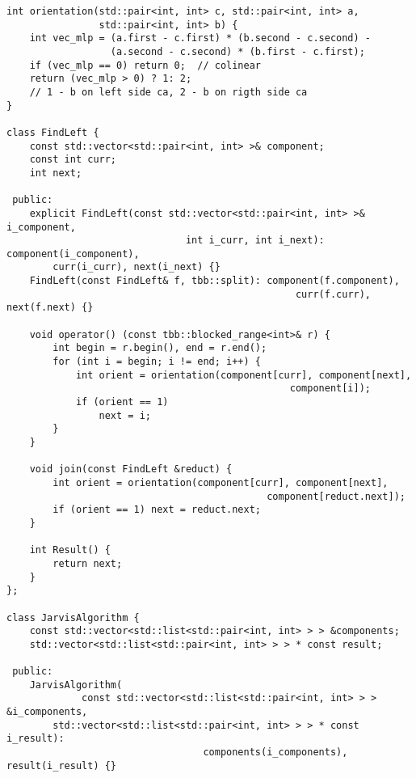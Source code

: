 \documentclass{report}
\begin{document}
\begin{lstlisting}
int orientation(std::pair<int, int> c, std::pair<int, int> a,
                std::pair<int, int> b) {
    int vec_mlp = (a.first - c.first) * (b.second - c.second) -
                  (a.second - c.second) * (b.first - c.first);
    if (vec_mlp == 0) return 0;  // colinear
    return (vec_mlp > 0) ? 1: 2;
    // 1 - b on left side ca, 2 - b on rigth side ca
}

class FindLeft {
    const std::vector<std::pair<int, int> >& component;
    const int curr;
    int next;

 public:
    explicit FindLeft(const std::vector<std::pair<int, int> >& i_component,
                               int i_curr, int i_next): component(i_component),
        curr(i_curr), next(i_next) {}
    FindLeft(const FindLeft& f, tbb::split): component(f.component),
                                                  curr(f.curr), next(f.next) {}

    void operator() (const tbb::blocked_range<int>& r) {
        int begin = r.begin(), end = r.end();
        for (int i = begin; i != end; i++) {
            int orient = orientation(component[curr], component[next],
                                                 component[i]);
            if (orient == 1)
                next = i;
        }
    }

    void join(const FindLeft &reduct) {
        int orient = orientation(component[curr], component[next],
                                             component[reduct.next]);
        if (orient == 1) next = reduct.next;
    }

    int Result() {
        return next;
    }
};

class JarvisAlgorithm {
    const std::vector<std::list<std::pair<int, int> > > &components;
    std::vector<std::list<std::pair<int, int> > > * const result;

 public:
    JarvisAlgorithm(
             const std::vector<std::list<std::pair<int, int> > > &i_components,
        std::vector<std::list<std::pair<int, int> > > * const i_result):
                                  components(i_components), result(i_result) {}


\end{lstlisting}
\end{document}
